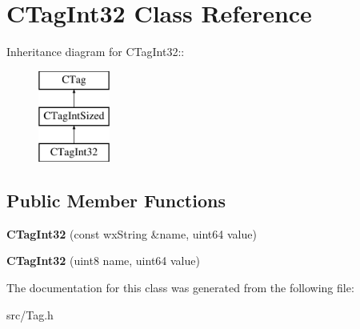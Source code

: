 \section{CTagInt32 Class Reference}
\label{classCTagInt32}
Inheritance diagram for CTagInt32::\begin{figure}[H]
\begin{center}
\leavevmode
\includegraphics[height=3cm]{classCTagInt32}
\end{center}
\end{figure}
\subsection*{Public Member Functions}
\begin{DoxyCompactItemize}
\item 
{\bfseries CTagInt32} (const wxString \&name, uint64 value)\label{classCTagInt32_aae92d076b0a891ff45fab43fc63a7669}

\item 
{\bfseries CTagInt32} (uint8 name, uint64 value)\label{classCTagInt32_a24ea7991a11e4dbead4a0fa2bc84b419}

\end{DoxyCompactItemize}


The documentation for this class was generated from the following file:\begin{DoxyCompactItemize}
\item 
src/Tag.h\end{DoxyCompactItemize}

